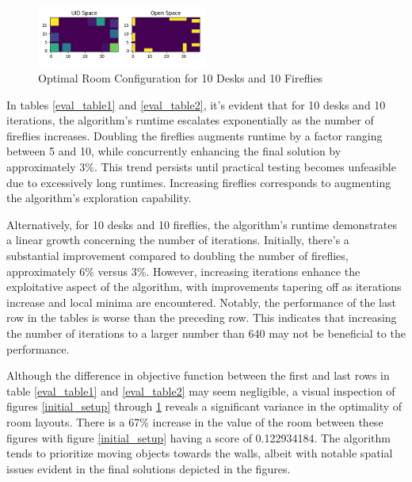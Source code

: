 \documentclass[sigconf,authordraft]{acmart}
\begin{document}
\begin{figure}
    \centering
    \includegraphics[width=0.5\textwidth]{conor_final_room1.png}
    \caption{Optimal Room Configuration for 10 Desks and 10 Fireflies}
    \label{final_setup2}
\end{figure}

In tables \ref{eval_table1} and \ref{eval_table2}, it's evident that for 10 desks and 10 iterations, the algorithm's runtime escalates exponentially as the number of fireflies increases. Doubling the fireflies augments runtime by a factor ranging between 5 and 10, while concurrently enhancing the final solution by approximately 3\%. This trend persists until practical testing becomes unfeasible due to excessively long runtimes. Increasing fireflies corresponds to augmenting the algorithm's exploration capability. 

Alternatively, for 10 desks and 10 fireflies, the algorithm's runtime demonstrates a linear growth concerning the number of iterations. Initially, there's a substantial improvement compared to doubling the number of fireflies, approximately 6\% versus 3\%. However, increasing iterations enhance the exploitative aspect of the algorithm, with improvements tapering off as iterations increase and local minima are encountered. Notably, the performance of the last row in the tables is worse than the preceding row. This indicates that increasing the number of iterations to a larger number than 640 may not be beneficial to the performance.

Although the difference in objective function between the first and last rows in table \ref{eval_table1} and \ref{eval_table2} may seem negligible, a visual inspection of figures \ref{initial_setup} through \ref{final_setup2} reveals a significant variance in the optimality of room layouts. There is a 67\% increase in the value of the room between these figures with figure \ref{initial_setup} having a score of 0.122934184. The algorithm tends to prioritize moving objects towards the walls, albeit with notable spatial issues evident in the final solutions depicted in the figures.
\end{document}
